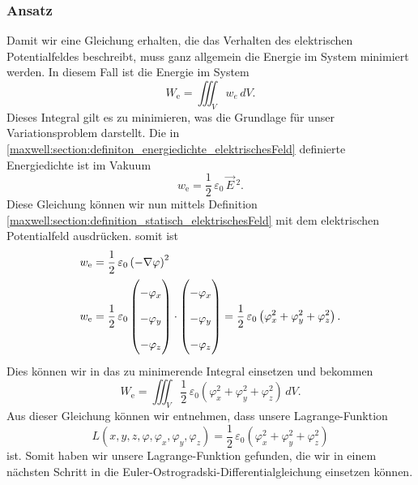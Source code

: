 \subsubsection{Ansatz}
Damit wir eine Gleichung erhalten, die das Verhalten des elektrischen Potentialfeldes beschreibt, muss ganz allgemein die Energie im System minimiert werden. 
In diesem Fall ist die Energie im System
\[
W_{\text{e}}
=
\iiint_V w_e\, dV.
\]
Dieses Integral gilt es zu minimieren, was die Grundlage für unser Variationsproblem darstellt.
Die in \eqref{maxwell:section:definiton_energiedichte_elektrischesFeld} definierte Energiedichte ist im Vakuum
\[
w_{\text{e}}
=
\frac{1}{2}\,\varepsilon_0\,\vec{E}\,^2.
\]
Diese Gleichung können wir nun mittels Definition \eqref{maxwell:section:definition_statisch_elektrischesFeld} mit dem elektrischen Potentialfeld ausdrücken.
somit ist
\begin{align}
\renewcommand{\arraystretch}{1.9}
w_{\text{e}}
&=
\frac{1}{2}\,\varepsilon_0\left(-\nabla\varphi\right)^2
\\
w_{\text{e}}
&=
\frac{1}{2}\,\varepsilon_0
\begin{pmatrix}
\displaystyle
-\varphi_x\\
\displaystyle
-\varphi_y\\
\displaystyle
-\varphi_z
\end{pmatrix}
\cdot
\begin{pmatrix}
\displaystyle
-\varphi_x\\
\displaystyle
-\varphi_y\\
\displaystyle
-\varphi_z
\end{pmatrix}
=
\frac{1}{2}\,\varepsilon_0\left(\varphi_x^2 + \varphi_y^2 + \varphi_z^2\right).
\label{maxwell:section:energiedichte}
\end{align}
Dies können wir in das zu minimerende Integral einsetzen und bekommen
\begin{equation}
	W_{\text{e}}
	=
	\iiint_V \frac{1}{2}\,\varepsilon_0\left(\varphi_x^2 + \varphi_y^2 + \varphi_z^2\right)\, dV.
	\label{maxwell:section:energieintegral_quellenfrei}
\end{equation}
Aus dieser Gleichung können wir entnehmen, dass unsere Lagrange-Funktion
\begin{equation}
	L(x,y,z,\varphi,\varphi_x,\varphi_y,\varphi_z)
	=
	\frac{1}{2}\,\varepsilon_0\left(\varphi_x^2 + \varphi_y^2 + \varphi_z^2\right)
	\label{maxwell:section:lagrangefunktion_quellenfrei}
\end{equation}
ist.
Somit haben wir unsere Lagrange-Funktion gefunden, die wir in einem nächsten Schritt in die Euler-Ostrogradski-Differentialgleichung einsetzen können.

